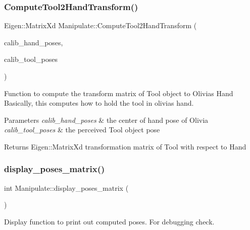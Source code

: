 \subsubsection{\texorpdfstring{Compute\+Tool2\+Hand\+Transform()}{ComputeTool2HandTransform()}}
{\footnotesize\ttfamily Eigen\+::\+Matrix\+Xd Manipulate\+::\+Compute\+Tool2\+Hand\+Transform (\begin{DoxyParamCaption}\item[{const geometry\+\_\+msgs\+::\+Pose\+Array}]{calib\+\_\+hand\+\_\+poses,  }\item[{const geometry\+\_\+msgs\+::\+Pose\+Array}]{calib\+\_\+tool\+\_\+poses }\end{DoxyParamCaption})\hspace{0.3cm}{\ttfamily [private]}}



Function to compute the transform matrix of Tool object to Olivia\textquotesingle{}s Hand Basically, this computes how to hold the tool in olivia\textquotesingle{}s hand. 


\begin{DoxyParams}{Parameters}
{\em calib\+\_\+hand\+\_\+poses} & the center of hand pose of Olivia \\
\hline
{\em calib\+\_\+tool\+\_\+poses} & the perceived Tool object pose \\
\hline
\end{DoxyParams}
\begin{DoxyReturn}{Returns}
Eigen\+::\+Matrix\+Xd transformation matrix of Tool with respect to Hand 
\end{DoxyReturn}
\mbox{\label{structManipulate_a9d9985f555d6eae5ed7baa77fe8b0969}} 
\subsubsection{\texorpdfstring{display\+\_\+poses\+\_\+matrix()}{display\_poses\_matrix()}}
{\footnotesize\ttfamily int Manipulate\+::display\+\_\+poses\+\_\+matrix (\begin{DoxyParamCaption}{ }\end{DoxyParamCaption})\hspace{0.3cm}{\ttfamily [private]}}



Display function to print out computed poses. For debugging check. 

